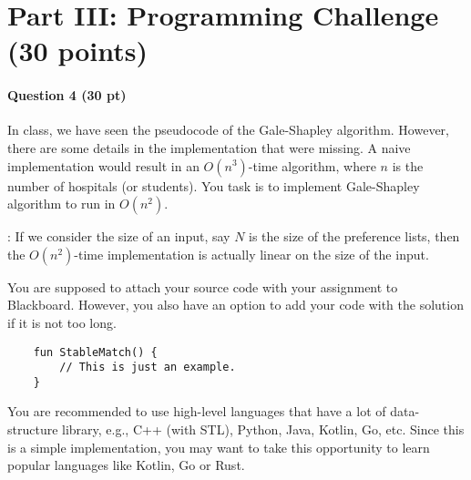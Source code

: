 \documentclass[11pt,letterpaper]{article}
\begin{document}
\pagebreak
\section*{Part III: Programming Challenge (30 points)}

\paragraph*{Question 4 (30 pt)} In class, we have seen the pseudocode of the Gale-Shapley algorithm. However, there are some details in the implementation that were missing. A naive implementation would result in an $O(n^3)$-time algorithm, where $n$ is the number of hospitals (or students). You task is to implement Gale-Shapley algorithm to run in $O(n^2)$.

\medskip
{}: If we consider the size of an input, say $N$ is the size of the preference lists, then the $O(n^2)$-time implementation is actually linear on the size of the input.

You are supposed to attach your source code with your assignment to Blackboard. However, you also have an option to add your code with the solution if it is not too long.

\begin{verbatim}
	fun StableMatch() {
		// This is just an example.
	}
\end{verbatim}

 You are recommended to use high-level languages that have a lot of data-structure library, e.g., C++ (with STL), Python, Java, Kotlin, Go, etc. Since this is a simple implementation, you may want to take this opportunity to learn popular languages like Kotlin, Go or Rust.
\end{document}
